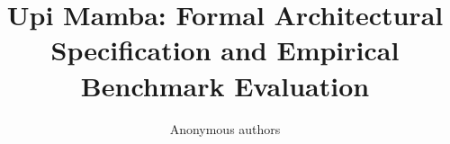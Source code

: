 \title{\textbf{Upi Mamba: Formal Architectural Specification and Empirical Benchmark Evaluation}}

\author{Anonymous authors}
